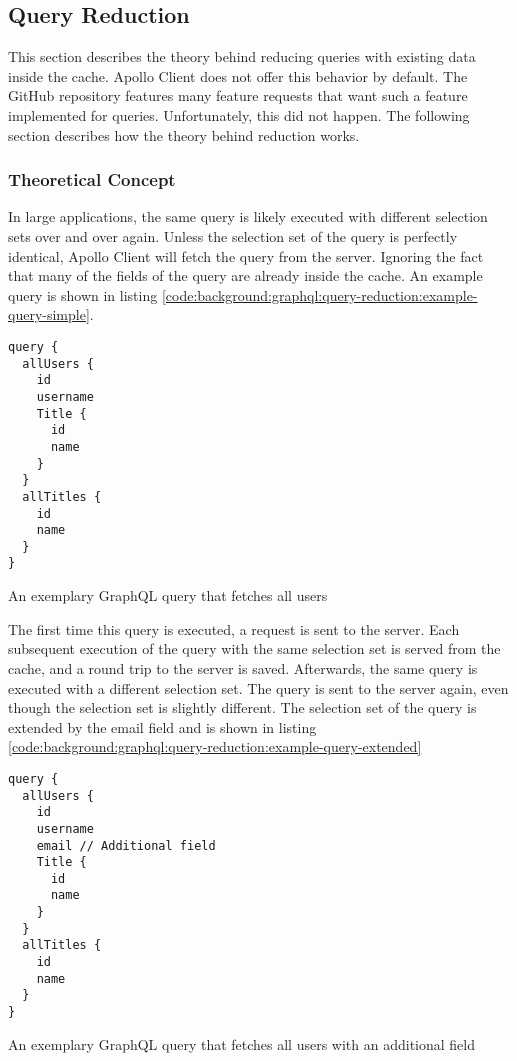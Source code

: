 \subsection{Query Reduction}

This section describes the theory behind reducing queries with existing data inside the cache. Apollo Client does not offer this behavior by default. The GitHub repository features many feature requests that want such a feature implemented for queries. Unfortunately, this did not happen. The following section describes how the theory behind reduction works.

\subsubsection{Theoretical Concept}

In large applications, the same query is likely executed with different selection sets over and over again. Unless the selection set of the query is perfectly identical, Apollo Client will fetch the query from the server. Ignoring the fact that many of the fields of the query are already inside the cache. An example query is shown in listing  \ref{code:background:graphql:query-reduction:example-query-simple}.

\ifshowListings
\begin{listing}[H]
    \begin{verbatim}
query {
  allUsers {
    id
    username
    Title {
      id
      name
    }
  }
  allTitles {
    id
    name
  }
}
    \end{verbatim}
    \caption{An exemplary GraphQL query that fetches all users}\label{code:background:graphql:query-reduction:example-query-simple}
\end{listing}
\fi

\noindent The first time this query is executed, a request is sent to the server. Each subsequent execution of the query with the same selection set is served from the cache, and a round trip to the server is saved. Afterwards, the same query is executed with a different selection set. The query is sent to the server again, even though the selection set is slightly different. The selection set of the query is extended by the email field and is shown in listing \ref{code:background:graphql:query-reduction:example-query-extended}

\ifshowListings
\begin{listing}[H]
    \begin{verbatim}
query {
  allUsers {
    id
    username
    email // Additional field
    Title {
      id
      name
    }
  }
  allTitles {
    id
    name
  }
}
    \end{verbatim}
    \caption{An exemplary GraphQL query that fetches all users with an additional field}\label{code:background:graphql:query-reduction:example-query-extended}
\end{listing}
\fi

